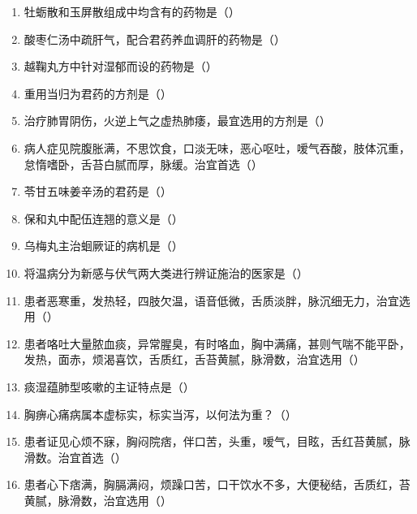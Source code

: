 \documentclass[a4paper,11pt]{ctexart}
\begin{document}
\begin{enumerate}
      \item 牡蛎散和玉屏散组成中均含有的药物是（\quad）
      \item 酸枣仁汤中疏肝气，配合君药养血调肝的药物是（\quad）
      \item 越鞠丸方中针对湿郁而设的药物是（\quad）
      \item 重用当归为君药的方剂是（\quad）
      \item 治疗肺胃阴伤，火逆上气之虚热肺痿，最宜选用的方剂是（\quad）
      \item 病人症见院腹胀满，不思饮食，口淡无味，恶心呕吐，嗳气吞酸，肢体沉重，怠惰嗜卧，舌苔白腻而厚，脉缓。治宜首选（\quad）
      \item 苓甘五味姜辛汤的君药是（\quad）
      \item 保和丸中配伍连翘的意义是（\quad）
      \item 乌梅丸主治蛔厥证的病机是（\quad）
      \item 将温病分为新感与伏气两大类进行辨证施治的医家是（\quad）
      \item 患者恶寒重，发热轻，四肢欠温，语音低微，舌质淡胖，脉沉细无力，治宜选用（\quad）
      \item 患者咯吐大量脓血痰，异常腥臭，有时咯血，胸中满痛，甚则气喘不能平卧，发热，面赤，烦渴喜饮，舌质红，舌苔黄腻，脉滑数，治宜选用（\quad）
      \item 痰湿蕴肺型咳嗽的主证特点是（\quad）
      \item 胸痹心痛病属本虚标实，标实当泻，以何法为重？（\quad）
      \item 患者证见心烦不寐，胸闷院痞，伴口苦，头重，嗳气，目眩，舌红苔黄腻，脉滑数。治宜首选（\quad）
      \item 患者心下痞满，胸膈满闷，烦躁口苦，口干饮水不多，大便秘结，舌质红，苔黄腻，脉滑数，治宜选用（\quad）

\end{enumerate}
\end{document}
